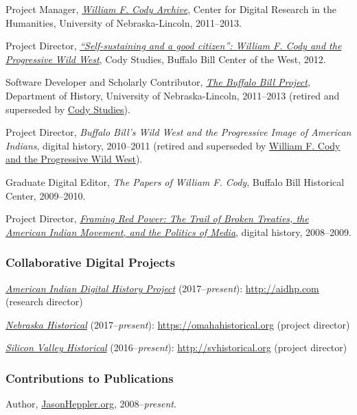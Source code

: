 Project Manager, \emph{\href{http://codyarchive.org/}{William F. Cody
Archive}}, Center for Digital Research in the Humanities, University of
Nebraska-Lincoln, 2011--2013.

Project Director,
\emph{\href{http://www.codystudies.org/showindians/}{``Self-sustaining
and a good citizen'': William F. Cody and the Progressive Wild West}},
Cody Studies, Buffalo Bill Center of the West, 2012.

Software Developer and Scholarly Contributor,
\emph{\href{http://buffalobillproject.unl.edu/}{The Buffalo Bill
Project}}, Department of History, University of Nebraska-Lincoln,
2011--2013 (retired and superseded by
\href{http://www.codystudies.org/}{Cody Studies}).

Project Director, \emph{Buffalo Bill's Wild West and the Progressive
Image of American Indians}, digital history, 2010--2011 (retired and
superseded by \href{http://www.codystudies.org/showindians/}{William F.
Cody and the Progressive Wild West}).

Graduate Digital Editor, \emph{The Papers of William F. Cody}, Buffalo
Bill Historical Center, 2009--2010.

Project Director, \emph{\href{http://framingredpower.org}{Framing Red
Power: The Trail of Broken Treaties, the American Indian Movement, and
the Politics of Media}}, digital history, 2008--2009.

\subsubsection{Collaborative Digital
Projects}\label{collaborative-digital-projects}

\emph{\href{http://aidhp.com}{American Indian Digital History Project}}
(2017--\emph{present}): \url{http://aidhp.com} (research director)

\emph{\href{https://omahahistorical.org}{Nebraska Historical}}
(2017--\emph{present}): \url{https://omahahistorical.org} (project
director)

\emph{\href{http://svhistorical.org}{Silicon Valley Historical}}
(2016--\emph{present}): \url{http://svhistorical.org} (project director)

\subsubsection{Contributions to
Publications}\label{contributions-to-publications}

Author, \href{http://jasonheppler.org}{JasonHeppler.org},
2008--\emph{present}.

